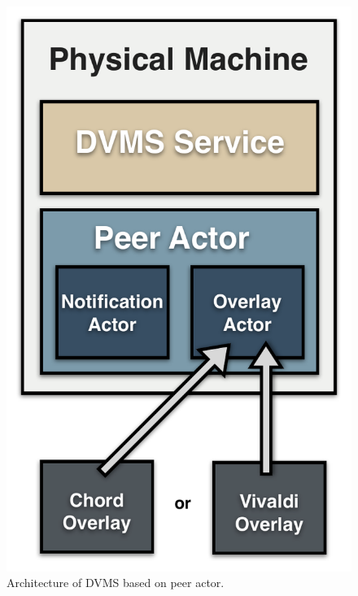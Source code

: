 \begin{figure}[h!]
  \centering
  \includegraphics[width=0.5\linewidth]{Figures/DVMS.pdf}
  \caption{Architecture of DVMS based on peer actor.}%
  \label{fig:isp}%
\end{figure}

